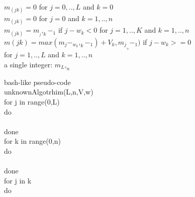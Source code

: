 \documentclass[12pt]{article}
\begin{document}
$m_(jk) = 0$ for  $j=0,..,L$ and $k = 0$\\

$m_(jk) = 0$ for $j=0$ and $k =1,..,n$\\ 

$m_(jk) = m__j,_k-_1$ if $j-w_k < 0$ for $j=1,..,K$ and $k = 1,..,n$\\

$m(jk) = max(m_j-_w_k,_k-_1) +V_k,m_j_,_k-_1)$ if $j-w_k>=0$\\

for $j=1,..,L$ and $k=1,..,n$\\

a single integer: $m_L,_n$

bash-like pseudo-code\\

unknownAlgotrhim(L,n,V,w)\\

for j in range(0,L)\\

do \\

\hspace{1cm}{m[j,0]=0}\\

done\\

for k in range(0,n)\\

do\\

\hspace{1cm}{m[0,k]=0}\\

done \\

for j in k \\

do \\

\hspace{1cm}{for k in n}\\

\hspace{1cm}{do}\\

\hspace{2cm}{if [m[j,k]==m[j,k-1]] then}\\

\hspace{3cm}{if [j - w[k] $<$ 0] then}\\

\hspace{4cm}{m[j,] = j- w[k]}\\
\end{document}

